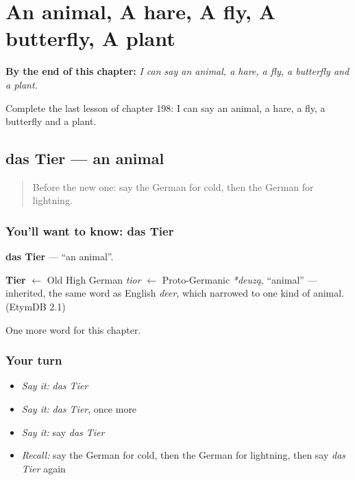 
\chapter{An animal, A hare, A fly, A butterfly, A plant}
\label{ch:ge-an-animal-a-hare-a-fly-a-butterfly-a-plant}

\begin{chapteropening}
\textbf{By the end of this chapter:} \emph{I can say an animal, a hare, a fly, a butterfly and a plant.}

Complete the last lesson of chapter 198: I can say an animal, a hare, a fly, a butterfly and a plant.
\end{chapteropening}

\section[das Tier]{das Tier — an animal}

\label{lesson:GE-C198-tier}



\begin{quote}
Before the new one: say the German for cold, then the German for lightning.
\end{quote}

\subsection*{You'll want to know: das Tier}
\textbf{das Tier} — \textquotedblleft{}an animal\textquotedblright{}.

\begin{cousinweb}
\textbf{Tier} $\leftarrow$ Old High German \emph{tior} $\leftarrow$ Proto-Germanic \emph{*deuzą}, \textquotedblleft{}animal\textquotedblright{} — inherited, the same word as English \emph{deer}, which narrowed to one kind of animal. (EtymDB 2.1)
\end{cousinweb}

\begin{grammarlens}[title={What you've built}]
One more word for this chapter.
\end{grammarlens}

\subsection*{Your turn}
\begin{itemize}
\raggedright
  \item \emph{Say it:} \emph{das Tier}
  \item \emph{Say it:} \emph{das Tier}, once more
  \item \emph{Say it:} say \emph{das Tier}
  \item \emph{Recall:} say the German for cold, then the German for lightning, then say \emph{das Tier} again
\end{itemize}

